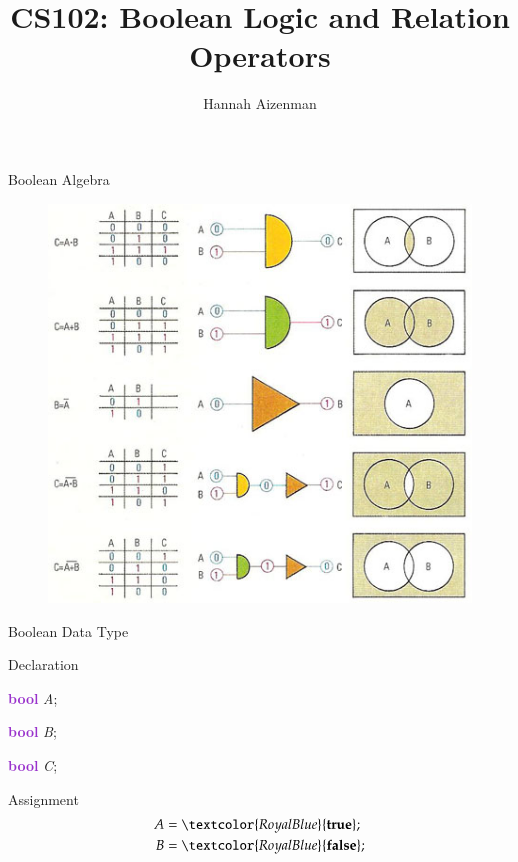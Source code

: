 \documentclass[xcolor={dvipsnames}]{beamer}
\begin{document}
\title{ CS102: Boolean Logic and Relation Operators }
\author{Hannah Aizenman}


\begin{frame}
	\titlepage
\end{frame}


\begin{frame}{Boolean Algebra}
	\begin{figure}
		\href{http://www.daviddarling.info/encyclopedia/B/Boolean_algebra.html}{\includegraphics[width=.75\textwidth]{Boolean_algebra}}
	\end{figure}
\end{frame}



\begin{frame}{Boolean Data Type}
\begin{block}{Declaration}
	\begin{center}
		\item \textcolor{DarkOrchid}{\textbf{bool}} \textit{A};\\
		\item \textcolor{DarkOrchid}{\textbf{bool}} \textit{B};
		\item \textcolor{DarkOrchid}{\textbf{bool}} \textit{C};
	\end{center}
\end{block}
\pause
\begin{block}{Assignment}
	\begin{align*}
		A &= \textcolor{RoyalBlue}{\textbf{true}};\\
		B &= \textcolor{RoyalBlue}{\textbf{false}};
	\end{align*}
\end{block}
\end{frame}
\end{document}

